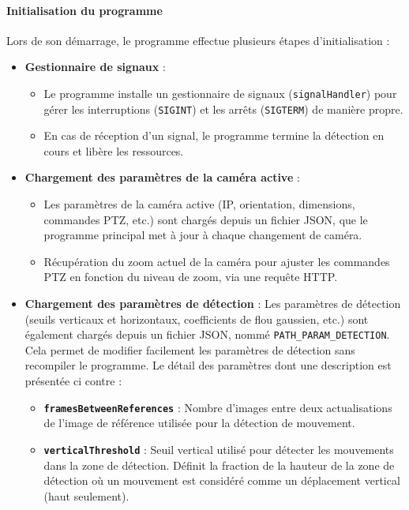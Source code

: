 \documentclass[a4paper, 11pt, french]{article}
\begin{document}
\paragraph{Initialisation du programme}
Lors de son démarrage, le programme effectue plusieurs étapes d'initialisation :
\begin{itemize}
    \item \textbf{Gestionnaire de signaux} :
    \begin{itemize}
        \item Le programme installe un gestionnaire de signaux (\texttt{signalHandler}) pour gérer les interruptions (\texttt{SIGINT}) et les arrêts (\texttt{SIGTERM}) de manière propre.
        \item En cas de réception d'un signal, le programme termine la détection en cours et libère les ressources.
    \end{itemize}
    \item \textbf{Chargement des paramètres de la caméra active} : 
    \begin{itemize}
        \item Les paramètres de la caméra active (IP, orientation, dimensions, commandes PTZ, etc.) sont chargés depuis un fichier JSON, que le programme principal met à jour à chaque changement de caméra.
        \item Récupération du zoom actuel de la caméra pour ajuster les commandes PTZ en fonction du niveau de zoom, via une requête HTTP.
    \end{itemize}
    \item \textbf{Chargement des paramètres de détection} : 
        Les paramètres de détection (seuils verticaux et horizontaux, coefficients de flou gaussien, etc.) sont également chargés depuis un fichier JSON, nommé \texttt{PATH\_PARAM\_DETECTION}. Cela permet de modifier facilement les paramètres de détection sans recompiler le programme. Le détail des paramètres dont une description est présentée ci contre :


    \begin{itemize}
        \item \textbf{\texttt{framesBetweenReferences}} : Nombre d'images entre deux actualisations de l'image de référence utilisée pour la détection de mouvement.
        
        \item \textbf{\texttt{verticalThreshold}} : Seuil vertical utilisé pour détecter les mouvements dans la zone de détection. Définit la fraction de la hauteur de la zone de détection où un mouvement est considéré comme un déplacement vertical (haut seulement).


\end{itemize}
\end{itemize}
\end{document}
